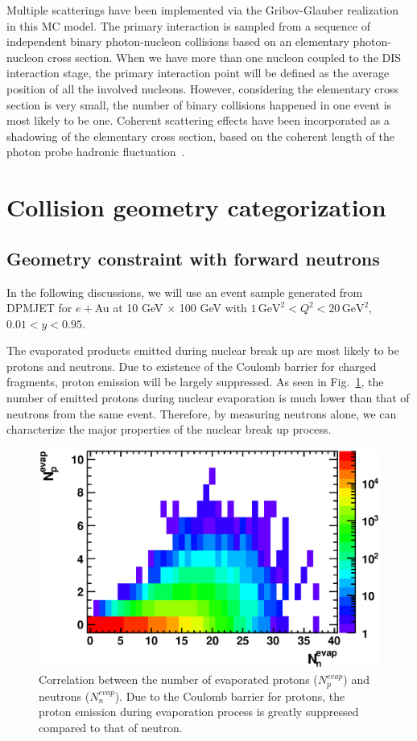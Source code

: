 Multiple scatterings have been implemented via the Gribov-Glauber
realization~\cite{Shmakov:1988sc} in this MC model. The primary interaction is
sampled from a sequence of independent binary photon-nucleon collisions based on
an elementary photon-nucleon cross section. When we have more than one nucleon
coupled to the DIS interaction stage, the primary interaction point will be
defined as the average position of all the involved nucleons. However,
considering the elementary cross section is very small, the number of binary
collisions happened in one event is most likely to be one. Coherent scattering
effects have been incorporated as a shadowing of the elementary cross section,
based on the coherent length of the photon probe hadronic
fluctuation~\cite{Piller:1999wx}.


\section{Collision geometry categorization} \label{sec:geoCategory}

\subsection{Geometry constraint with forward neutrons}
In the following discussions, we will use an event sample
generated from DPMJET for $e+$Au at 10 GeV $\times$ 100 GeV with $1 \, \mathrm{GeV}^{2}
< Q^{2} < 20 \, \mathrm{GeV}^{2}$, $ 0.01<y<0.95$.

The evaporated products emitted during nuclear break up are most likely to be protons
and neutrons. Due to existence of the Coulomb barrier for charged fragments,
proton emission will be largely suppressed. As seen in
Fig.~\ref{fig:evapNeutronVsProton}, the number of emitted protons during nuclear
evaporation is much lower than that of neutrons from the same event.
Therefore, by measuring neutrons alone, we can characterize the major
properties of the nuclear break up process.

\begin{figure}
\begin{center}
\includegraphics[width=0.7\columnwidth,keepaspectratio]{plots/chpt7/evap_protonVsneutron.eps}
\caption[proton neutron number correlation during evaporation]{Correlation between the number of evaporated protons ($N^{evap}_{p}$) and neutrons ($N^{evap}_{n}$). Due
to the Coulomb barrier for protons, the proton emission during
evaporation process is greatly suppressed compared to that of neutron.}
\label{fig:evapNeutronVsProton}
\end{center}
\end{figure}

